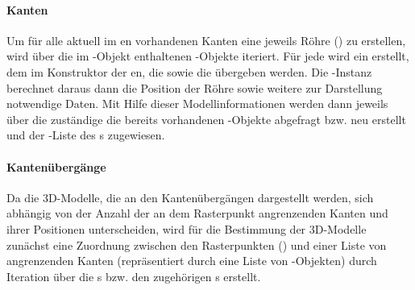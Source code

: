\paragraph{Kanten}

Um für alle aktuell im en vorhandenen Kanten eine jeweils Röhre () zu erstellen, wird über die im -Objekt enthaltenen -Objekte iteriert. Für jede  wird ein  erstellt, dem im Konstruktor der en, die  sowie die  übergeben werden. Die -Instanz berechnet daraus dann die Position der Röhre sowie weitere zur Darstellung notwendige Daten. Mit Hilfe dieser Modellinformationen werden dann jeweils über die zuständige  die bereits vorhandenen -Objekte abgefragt bzw. neu erstellt und der -Liste des s zugewiesen.

\paragraph{Kantenübergänge}

Da die 3D-Modelle, die an den Kantenübergängen dargestellt werden, sich abhängig von der Anzahl der an dem Rasterpunkt angrenzenden Kanten und ihrer Positionen unterscheiden, wird für die Bestimmung der 3D-Modelle zunächst eine Zuordnung zwischen den Rasterpunkten () und einer Liste von angrenzenden Kanten (repräsentiert durch eine Liste von -Objekten) durch Iteration über die s bzw. den zugehörigen s erstellt.



